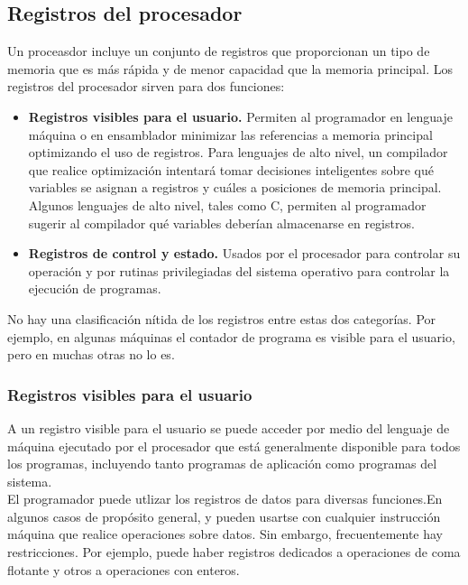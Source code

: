 \documentclass{article}
\begin{document}
	\subsection{Registros del procesador}
		Un proceasdor incluye un conjunto de registros que proporcionan un tipo de memoria que es más rápida y de menor capacidad que la memoria principal. Los registros del procesador sirven para dos funciones:
		
		\begin{itemize}
			\item \textbf{Registros visibles para el usuario.} Permiten al programador en lenguaje máquina o en ensamblador minimizar las referencias a memoria principal optimizando el uso de registros. Para lenguajes de alto nivel, un compilador que realice optimización intentará tomar decisiones inteligentes sobre qué variables se asignan a registros y cuáles a posiciones de memoria principal. Algunos lenguajes de alto nivel, tales como C, permiten al programador sugerir al compilador qué variables deberían almacenarse en registros.
			
			\item \textbf{Registros de control y estado.} Usados por el procesador para controlar su operación y por rutinas privilegiadas del sistema operativo para controlar la ejecución de programas.
		\end{itemize}
		
		No hay una clasificación nítida de los registros entre estas dos categorías. Por ejemplo, en algunas máquinas el contador de programa es visible para el usuario, pero en muchas otras no lo es.
		
		\subsubsection{Registros visibles para el usuario}
		
			A un registro visible para el usuario se puede acceder por medio del lenguaje de máquina ejecutado por el procesador que está generalmente disponible para todos los programas, incluyendo tanto programas de aplicación como programas del sistema. \\ 
			
			El programador puede utlizar los registros de datos para diversas funciones.En algunos casos de propósito general, y pueden usartse con cualquier instrucción máquina que realice operaciones sobre datos. Sin embargo, frecuentemente hay restricciones. Por ejemplo, puede haber registros dedicados a operaciones de coma flotante y otros a operaciones con enteros. \\ 
			
\end{document}
